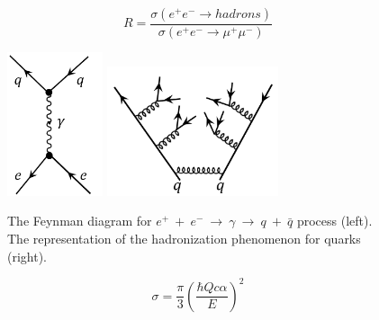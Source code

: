 \begin{equation}
R=\frac{\sigma(e^{+}e^{-}\rightarrow hadrons)}{\sigma(e^{+}e^{-}\rightarrow \mu^{+}\mu^{-})}
\label{eq:R_value}
\end{equation}

\begin{figure}[h!]
 \begin{center}
\includegraphics[width=0.25\textwidth]{figures/theory/feynman_ee_qq.png}
\includegraphics[width=0.45\textwidth]{figures/theory/feynman_hadronic.png}
\caption{The Feynman diagram for $e^{+}~+~e^{-}~\rightarrow~\gamma~\rightarrow~q~+~\bar{q}$ process (left). The representation of the hadronization phenomenon for quarks (right).}
  \label{fig:ee_qq_hadron}
 \end{center}
\end{figure}

\begin{equation}
\sigma=\frac{\pi}{3}(\frac{\hbar Qc\alpha}{E})^{2}
\label{eq:ee_XS}
\end{equation}

